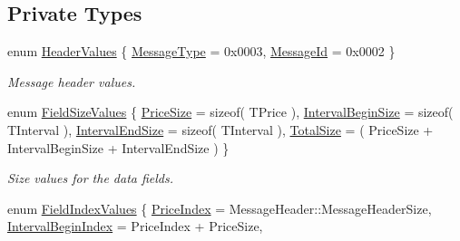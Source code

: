 \subsection*{Private Types}
\begin{DoxyCompactItemize}
\item 
enum \hyperlink{class_terra_swarm_1_1_synchronous_1_1_set_current_price_a940712bcf18dc80c00b4d79fe18edf9b}{Header\-Values} \{ \hyperlink{class_terra_swarm_1_1_synchronous_1_1_set_current_price_a940712bcf18dc80c00b4d79fe18edf9ba465058dd25ba7ae05bc5285a2d3708b1}{Message\-Type} = 0x0003, 
\hyperlink{class_terra_swarm_1_1_synchronous_1_1_set_current_price_a940712bcf18dc80c00b4d79fe18edf9baa56dbab91fc6a488f2a629b3278a7580}{Message\-Id} = 0x0002
 \}
\begin{DoxyCompactList}\small\item\em Message header values. \end{DoxyCompactList}\item 
enum \hyperlink{class_terra_swarm_1_1_synchronous_1_1_set_current_price_a8e183f6b467bff2559f766835197fb5d}{Field\-Size\-Values} \{ \hyperlink{class_terra_swarm_1_1_synchronous_1_1_set_current_price_a8e183f6b467bff2559f766835197fb5da6d42507cf32e815416954a4126721a75}{Price\-Size} = sizeof( T\-Price ), 
\hyperlink{class_terra_swarm_1_1_synchronous_1_1_set_current_price_a8e183f6b467bff2559f766835197fb5da53a8281758edfad40d43fba9a81dc5c5}{Interval\-Begin\-Size} = sizeof( T\-Interval ), 
\hyperlink{class_terra_swarm_1_1_synchronous_1_1_set_current_price_a8e183f6b467bff2559f766835197fb5da289d263a3891286fe193d5c69ad33691}{Interval\-End\-Size} = sizeof( T\-Interval ), 
\hyperlink{class_terra_swarm_1_1_synchronous_1_1_set_current_price_a8e183f6b467bff2559f766835197fb5da6e935dcdc8159878532d28b745c005c8}{Total\-Size} = ( Price\-Size + Interval\-Begin\-Size + Interval\-End\-Size )
 \}
\begin{DoxyCompactList}\small\item\em Size values for the data fields. \end{DoxyCompactList}\item 
enum \hyperlink{class_terra_swarm_1_1_synchronous_1_1_set_current_price_a1e2f6ce793cf79b121b76b6903e9df58}{Field\-Index\-Values} \{ \hyperlink{class_terra_swarm_1_1_synchronous_1_1_set_current_price_a1e2f6ce793cf79b121b76b6903e9df58a5885a64cfebb23b330bc57406aeca87c}{Price\-Index} = Message\-Header\-:\-:Message\-Header\-Size, 
\hyperlink{class_terra_swarm_1_1_synchronous_1_1_set_current_price_a1e2f6ce793cf79b121b76b6903e9df58ad2470cb4012d8a03a476f2c0a7ed837d}{Interval\-Begin\-Index} = Price\-Index + Price\-Size, 

\end{DoxyCompactItemize}
